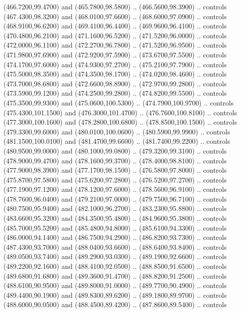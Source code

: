 {\begin{scope}[y=0.80pt, x=0.80pt, yscale=-1, xscale=1, inner sep=0pt, outer sep=0pt, #1]
      (466.7200,99.4700) and (465.7800,98.5800) .. (466.5600,98.3900) .. controls
      (467.4300,98.3200) and (468.0100,97.6600) .. (468.6000,97.0900) .. controls
      (468.9100,96.6200) and (469.4100,96.4400) .. (469.9600,96.4100) .. controls
      (470.4800,96.2100) and (471.1600,96.5200) .. (471.5200,96.0000) .. controls
      (472.0000,96.1100) and (472.2700,96.7800) .. (471.5200,96.9500) .. controls
      (471.9800,97.6900) and (472.9200,97.5900) .. (473.6700,97.5500) .. controls
      (474.1700,97.6000) and (474.9300,97.2700) .. (475.2100,97.7900) .. controls
      (475.5000,98.3500) and (474.3500,98.1700) .. (474.0200,98.4600) .. controls
      (473.7000,98.6800) and (472.6600,98.8900) .. (472.9700,99.2800) .. controls
      (473.5900,99.1200) and (474.2500,99.2800) .. (474.8200,99.5500) .. controls
      (475.3500,99.9300) and (475.0600,100.5300) .. (474.7900,100.9700) .. controls
      (475.4300,101.1500) and (476.3000,101.4700) .. (476.7600,100.8100) .. controls
      (477.3000,100.1600) and (478.2800,100.6800) .. (478.8500,100.1500) .. controls
      (479.3300,99.6000) and (480.0100,100.0600) .. (480.5900,99.9900) .. controls
      (481.1500,100.0100) and (481.4700,99.6600) .. (481.7400,99.2200) .. controls
      (480.9500,99.0000) and (480.1000,99.0800) .. (479.3200,99.3100) .. controls
      (478.9000,99.4700) and (478.1600,99.3700) .. (478.4000,98.8100) .. controls
      (477.9000,98.3900) and (477.1700,98.1500) .. (476.5800,97.8000) .. controls
      (475.8700,97.5800) and (475.6200,97.2800) .. (476.5200,97.2700) .. controls
      (477.1900,97.1200) and (478.1200,97.6000) .. (478.5600,96.9100) .. controls
      (478.7600,96.0400) and (479.2100,97.0000) .. (479.7500,96.7100) .. controls
      (480.7500,95.9400) and (482.1000,96.2700) .. (483.2300,95.8800) .. controls
      (483.6600,95.3200) and (484.3500,95.4800) .. (484.9600,95.3800) .. controls
      (485.7000,95.5200) and (485.4800,94.8000) .. (485.6100,94.3300) .. controls
      (486.0000,94.1400) and (486.7500,94.2900) .. (486.8200,93.7300) .. controls
      (487.4300,93.7000) and (488.0400,93.6600) .. (488.6400,93.8400) .. controls
      (489.0500,93.7400) and (489.2900,93.0300) .. (489.1900,92.6600) .. controls
      (489.2200,92.1600) and (488.4100,92.0500) .. (488.8500,91.6500) .. controls
      (489.6800,91.6800) and (489.3600,91.4700) .. (488.8200,91.2500) .. controls
      (488.6100,90.9500) and (489.8000,91.0000) .. (489.7700,90.4900) .. controls
      (489.4400,90.1900) and (489.8300,89.6200) .. (489.1800,89.9700) .. controls
      (488.6000,90.0500) and (488.4500,89.4200) .. (487.8600,89.5400) .. controls

\end{scope}}
